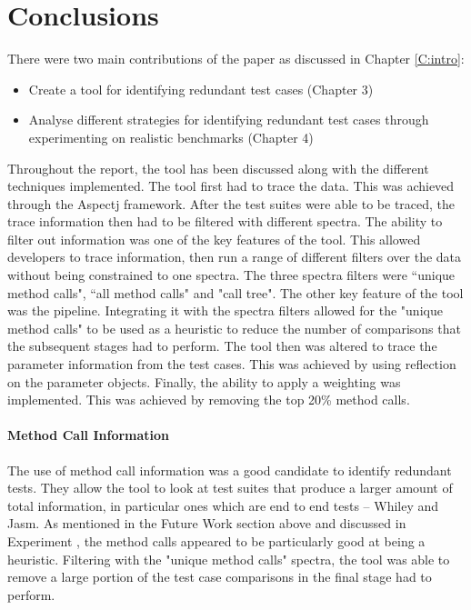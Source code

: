 \section{Conclusions}

There were two main contributions of the paper as discussed in Chapter \ref{C:intro}:

\begin{itemize}
\item Create a tool for identifying redundant test cases (Chapter 3)
\item Analyse different strategies for identifying redundant test cases through experimenting on realistic benchmarks (Chapter 4)
\end{itemize}

Throughout the report, the tool has been discussed along with the different techniques implemented. The tool first had to trace the data. This was achieved through the Aspectj framework. After the test suites were able to be traced, the trace information then had to be filtered with different spectra. The ability to filter out information was one of the key features of the tool. This allowed developers to trace information, then run a range of different filters over the data without being constrained to one spectra. The three spectra filters were ``unique method calls", ``all method calls" and "call tree". The other key feature of the tool was the pipeline. Integrating it with the spectra filters allowed for the "unique method calls" to be used as a heuristic to reduce the number of comparisons that the subsequent stages had to perform. The tool then was altered to trace the parameter information from the test cases. This was achieved by using reflection on the parameter objects. Finally, the ability to apply a weighting was implemented. This was achieved by removing the top 20\% method calls.

\paragraph{Method Call Information}
The use of method call information was a good candidate to identify redundant tests. They allow the tool to look at test suites that produce a larger amount of total information, in particular ones which are end to end tests -- Whiley and Jasm. As mentioned in the Future Work section above and discussed in Experiment , the method calls appeared to be particularly good at being a heuristic. Filtering with the "unique method calls" spectra, the tool was able to remove a large portion of the test case comparisons in the final stage had to perform.

